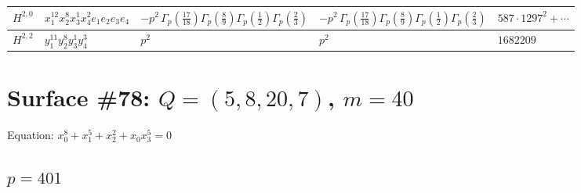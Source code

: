 \documentclass[11pt]{article}
\begin{document}
\begin{table}[ht]
{\begin{tabular}{@{}lllll@{}}
\midrule
$H^{2,0}$ & $x_{1}^{12} x_{2}^{8} x_{3}^{1} x_{4}^{2}  e_{1} e_{2} e_{3} e_{4}$ & $- p^{2} \, \Gamma_p \left( \frac{17}{18} \right) \Gamma_p \left( \frac{8}{9} \right) \Gamma_p \left( \frac{1}{2} \right) \Gamma_p \left( \frac{2}{3} \right)$ & $- p^{2} \, \Gamma_p \left( \frac{17}{18} \right) \Gamma_p \left( \frac{8}{9} \right) \Gamma_p \left( \frac{1}{2} \right) \Gamma_p \left( \frac{2}{3} \right)$ & $587{\cdot}1297^{2}{+}\cdots$ \\
\midrule
$H^{2,2}$ & $y_{1}^{11} y_{2}^{8} y_{3}^{1} y_{4}^{3}$ & $p^{2} \,$ & $p^{2} \,$ & $1682209$ \\
\bottomrule
\end{tabular}
}
\renewcommand{\arraystretch}{1.0}
\end{table}

\newpage

\section*{Surface \#78: $Q=(5, 8, 20, 7)$, $m=40$}

Equation: $x_0^{8} + x_1^{5} + x_2^{2} + x_0 x_3^{5} = 0$

\subsection*{$p = 401$}
\end{document}
